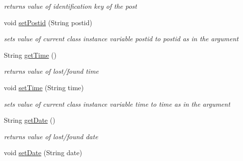\begin{DoxyCompactItemize}
\begin{DoxyCompactList}\small\item\em returns value of identification key of the post \end{DoxyCompactList}\item 
void \hyperlink{classcom_1_1example_1_1sel_1_1lostfound_1_1UserPost_adda27053c3527cdd6dcdd0d16ea45c9e}{set\+Postid} (String postid)\hypertarget{classcom_1_1example_1_1sel_1_1lostfound_1_1UserPost_adda27053c3527cdd6dcdd0d16ea45c9e}{}\label{classcom_1_1example_1_1sel_1_1lostfound_1_1UserPost_adda27053c3527cdd6dcdd0d16ea45c9e}

\begin{DoxyCompactList}\small\item\em sets value of current class instance variable postid to postid as in the argument \end{DoxyCompactList}\item 
String \hyperlink{classcom_1_1example_1_1sel_1_1lostfound_1_1UserPost_a77c13234097e4f44f6e0710c74987f87}{get\+Time} ()\hypertarget{classcom_1_1example_1_1sel_1_1lostfound_1_1UserPost_a77c13234097e4f44f6e0710c74987f87}{}\label{classcom_1_1example_1_1sel_1_1lostfound_1_1UserPost_a77c13234097e4f44f6e0710c74987f87}

\begin{DoxyCompactList}\small\item\em returns value of lost/found time \end{DoxyCompactList}\item 
void \hyperlink{classcom_1_1example_1_1sel_1_1lostfound_1_1UserPost_a7022a68202224f955065e5b400bb3e95}{set\+Time} (String time)\hypertarget{classcom_1_1example_1_1sel_1_1lostfound_1_1UserPost_a7022a68202224f955065e5b400bb3e95}{}\label{classcom_1_1example_1_1sel_1_1lostfound_1_1UserPost_a7022a68202224f955065e5b400bb3e95}

\begin{DoxyCompactList}\small\item\em sets value of current class instance variable time to time as in the argument \end{DoxyCompactList}\item 
String \hyperlink{classcom_1_1example_1_1sel_1_1lostfound_1_1UserPost_a9699a5945d28663ac8d74c2b19baf8ea}{get\+Date} ()\hypertarget{classcom_1_1example_1_1sel_1_1lostfound_1_1UserPost_a9699a5945d28663ac8d74c2b19baf8ea}{}\label{classcom_1_1example_1_1sel_1_1lostfound_1_1UserPost_a9699a5945d28663ac8d74c2b19baf8ea}

\begin{DoxyCompactList}\small\item\em returns value of lost/found date \end{DoxyCompactList}\item 
void \hyperlink{classcom_1_1example_1_1sel_1_1lostfound_1_1UserPost_a97f4bc20fcf5d8b66ab3756acf5fa7ff}{set\+Date} (String date)\hypertarget{classcom_1_1example_1_1sel_1_1lostfound_1_1UserPost_a97f4bc20fcf5d8b66ab3756acf5fa7ff}{}\label{classcom_1_1example_1_1sel_1_1lostfound_1_1UserPost_a97f4bc20fcf5d8b66ab3756acf5fa7ff}


\end{DoxyCompactItemize}
